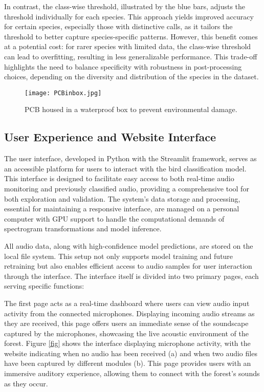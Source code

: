 In contrast, the class-wise threshold, illustrated by the blue bars, adjusts the threshold individually for each species. This approach yields improved accuracy for certain species, especially those with distinctive calls, as it tailors the threshold to better capture species-specific patterns. However, this benefit comes at a potential cost: for rarer species with limited data, the class-wise threshold can lead to overfitting, resulting in less generalizable performance. This trade-off highlights the need to balance specificity with robustness in post-processing choices, depending on the diversity and distribution of the species in the dataset.

\begin{figure}[h]
    \centering
    \texttt{[image: PCBinbox.jpg]}
    \caption{PCB housed in a waterproof box to prevent environmental damage.}
    \vspace{0.1cm}
    \label{fig:pcb_box}
\end{figure}

\subsection{User Experience and Website Interface}

The user interface, developed in Python with the Streamlit framework, serves as an accessible platform for users to interact with the bird classification model. This interface is designed to facilitate easy access to both real-time audio monitoring and previously classified audio, providing a comprehensive tool for both exploration and validation. The system’s data storage and processing, essential for maintaining a responsive interface, are managed on a personal computer with GPU support to handle the computational demands of spectrogram transformations and model inference.

All audio data, along with high-confidence model predictions, are stored on the local file system. This setup not only supports model training and future retraining but also enables efficient access to audio samples for user interaction through the interface. The interface itself is divided into two primary pages, each serving specific functions:

The first page acts as a real-time dashboard where users can view audio input activity from the connected microphones. Displaying incoming audio streams as they are received, this page offers users an immediate sense of the soundscape captured by the microphones, showcasing the live acoustic environment of the forest. Figure \ref{fig} shows the interface displaying microphone activity, with the website indicating when no audio has been received (a) and when two audio files have been captured by different modules (b). This page provides users with an immersive auditory experience, allowing them to connect with the forest’s sounds as they occur.

